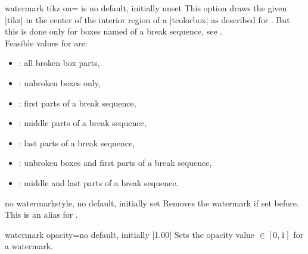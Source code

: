 \begin{docTcbKey}{watermark tikz on}{= is }{no default, initially unset}
  This option draws the given |tikz|  in the center of the interior region of a |tcolorbox|
  as described for .
  But this is done only for boxes named  of a break sequence, see
  .\\ 
  Feasible values for  are:
  \begin{itemize}
  \item{}: all broken box parts,
  \item{}: unbroken boxes only,
  \item{}: first parts of a break sequence,
  \item{}: middle parts of a break sequence,
  \item{}: last parts of a break sequence,
  \item{}: unbroken boxes and first parts of a break sequence,
  \item{}: middle and last parts of a break sequence.
  \end{itemize}
\end{docTcbKey}


\begin{docTcbKey}{no watermark}{}{style, no default, initially set}
  Removes the watermark if set before. This is an alias for
  .
\end{docTcbKey}


\clearpage
\begin{docTcbKey}{watermark opacity}{=}{no default, initially |1.00|}
  Sets the opacity value $\in[0,1]$ for a watermark.
\begin{dispExample}

\begin{tcolorbox}[title=Opacity 1.00,watermark opacity=1.00]
\lipsum[2]
\end{tcolorbox}\hfill%
\begin{tcolorbox}[title=Opacity 0.50,watermark opacity=0.50]
\lipsum[2]
\end{tcolorbox}%
\end{dispExample}
\end{docTcbKey}

